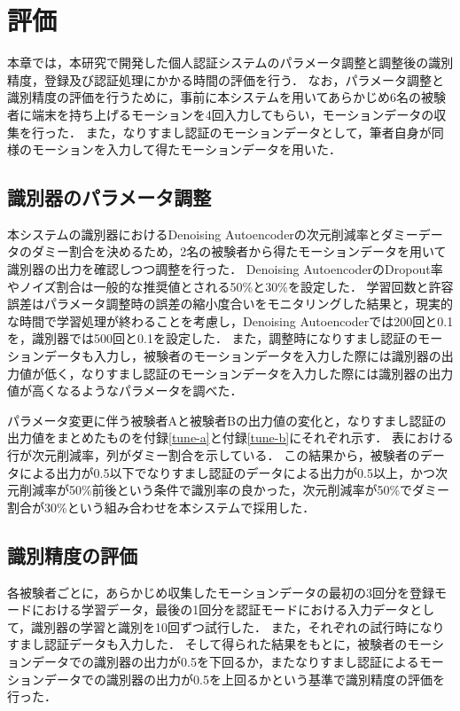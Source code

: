 \chapter{評価}
本章では，本研究で開発した個人認証システムのパラメータ調整と調整後の識別精度，登録及び認証処理にかかる時間の評価を行う．
なお，パラメータ調整と識別精度の評価を行うために，事前に本システムを用いてあらかじめ6名の被験者に端末を持ち上げるモーションを4回入力してもらい，モーションデータの収集を行った．
また，なりすまし認証のモーションデータとして，筆者自身が同様のモーションを入力して得たモーションデータを用いた．

\section{識別器のパラメータ調整}
本システムの識別器におけるDenoising Autoencoderの次元削減率とダミーデータのダミー割合を決めるため，2名の被験者から得たモーションデータを用いて識別器の出力を確認しつつ調整を行った．
Denoising AutoencoderのDropout率やノイズ割合は一般的な推奨値とされる50\%と30\%を設定した．
学習回数と許容誤差はパラメータ調整時の誤差の縮小度合いをモニタリングした結果と，現実的な時間で学習処理が終わることを考慮し，Denoising Autoencoderでは200回と0.1を，識別器では500回と0.1を設定した．
また，調整時になりすまし認証のモーションデータも入力し，被験者のモーションデータを入力した際には識別器の出力値が低く，なりすまし認証のモーションデータを入力した際には識別器の出力値が高くなるようなパラメータを調べた．

パラメータ変更に伴う被験者Aと被験者Bの出力値の変化と，なりすまし認証の出力値をまとめたものを付録\ref{tune-a}と付録\ref{tune-b}にそれぞれ示す．
表における行が次元削減率，列がダミー割合を示している．
この結果から，被験者のデータによる出力が0.5以下でなりすまし認証のデータによる出力が0.5以上，かつ次元削減率が50\%前後という条件で識別率の良かった，次元削減率が50\%でダミー割合が30\%という組み合わせを本システムで採用した．

\section{識別精度の評価}
各被験者ごとに，あらかじめ収集したモーションデータの最初の3回分を登録モードにおける学習データ，最後の1回分を認証モードにおける入力データとして，識別器の学習と識別を10回ずつ試行した．
また，それぞれの試行時になりすまし認証データも入力した．
そして得られた結果をもとに，被験者のモーションデータでの識別器の出力が0.5を下回るか，またなりすまし認証によるモーションデータでの識別器の出力が0.5を上回るかという基準で識別精度の評価を行った．

